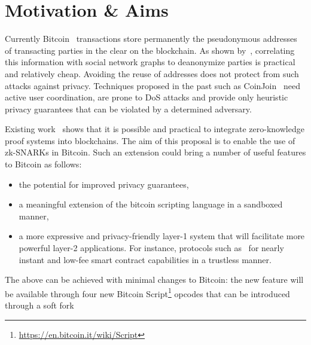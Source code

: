 \section{Motivation \& Aims}
  Currently Bitcoin~\cite{bitcoin} transactions store permanently the
  pseudonymous addresses of transacting parties in the clear on the blockchain.
  As shown by~\cite{DBLP:conf/fc/AndroulakiKRSC13}, correlating this information
  with social network graphs to deanonymize parties is practical and relatively
  cheap. Avoiding the reuse of addresses does not protect from such attacks
  against privacy. Techniques proposed in the past such as
  CoinJoin~\cite{DBLP:conf/trustcom/MaurerNF17} need active user coordination,
  are prone to DoS attacks and provide only heuristic privacy guarantees that
  can be violated by a determined adversary.

  Existing work~\cite{DBLP:conf/sp/Ben-SassonCG0MTV14,zcash-protocol,kachina}
  shows that it is possible and practical to integrate zero-knowledge proof
  systems into blockchains. The aim of this proposal is to enable the use of
  zk-SNARKs in Bitcoin. Such an extension could bring a number of useful
  features to Bitcoin as follows: %
  \begin{itemize}
    \item the potential for improved privacy guarantees,
    \item a meaningful extension of the bitcoin scripting language in a sandboxed manner,
    \item a more expressive and privacy-friendly layer-1 system that will facilitate more powerful layer-2 applications. For instance, protocols such as~\cite{DBLP:conf/sss/DeckerW15,lightning,perun,DBLP:conf/systor/LindNEKPS18,sprites}
    for nearly instant and low-fee smart contract capabilities in a trustless
    manner.
  \end{itemize}
  The above can be achieved with minimal changes to Bitcoin: the new feature
  will be available through four new Bitcoin
  Script\footnote{\url{https://en.bitcoin.it/wiki/Script}} opcodes that can be
  introduced through a soft fork~\cite{DBLP:conf/fc/ZamyatinSJSWK18}
